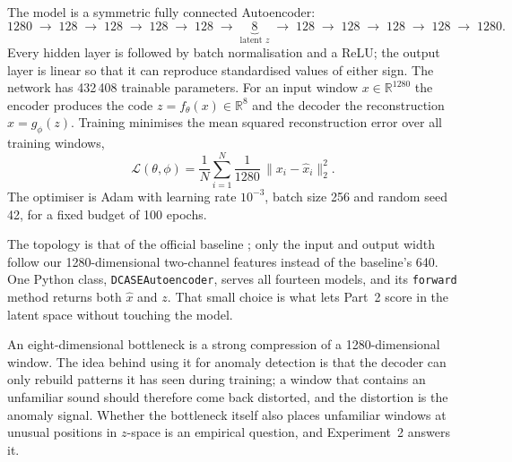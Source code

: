The model is a symmetric fully connected Autoencoder:
\begin{equation}
1280 \;\to\; 128 \;\to\; 128 \;\to\; 128 \;\to\; 128 \;\to\; \underbrace{8}_{\text{latent } z} \;\to\; 128 \;\to\; 128 \;\to\; 128 \;\to\; 128 \;\to\; 1280 .
\label{eq:topology}
\end{equation}
Every hidden layer is followed by batch normalisation and a ReLU; the output layer is linear so that it can reproduce standardised values of either sign. The network has 432\,408 trainable parameters. For an input window $x \in \mathbb{R}^{1280}$ the encoder produces the code $z = f_\theta(x) \in \mathbb{R}^{8}$ and the decoder the reconstruction $\hat{x} = g_\phi(z)$. Training minimises the mean squared reconstruction error over all training windows,
\begin{equation}
\mathcal{L}(\theta,\phi) = \frac{1}{N}\sum_{i=1}^{N} \frac{1}{1280}\,\lVert x_i - \hat{x}_i \rVert_2^2 .
\label{eq:loss}
\end{equation}
The optimiser is Adam with learning rate $10^{-3}$, batch size 256 and random seed 42, for a fixed budget of 100 epochs.

The topology is that of the official baseline \cite{harada2023}; only the input and output width follow our 1280-dimensional two-channel features instead of the baseline's 640. One Python class, \texttt{DCASEAutoencoder}, serves all fourteen models, and its \texttt{forward} method returns both $\hat{x}$ and $z$. That small choice is what lets Part~2 score in the latent space without touching the model.

An eight-dimensional bottleneck is a strong compression of a 1280-dimensional window. The idea behind using it for anomaly detection is that the decoder can only rebuild patterns it has seen during training; a window that contains an unfamiliar sound should therefore come back distorted, and the distortion is the anomaly signal. Whether the bottleneck itself also places unfamiliar windows at unusual positions in $z$-space is an empirical question, and Experiment~2 answers it.

